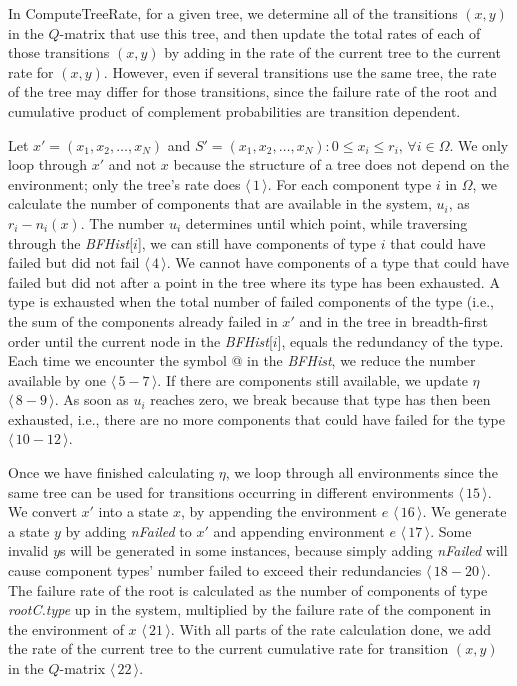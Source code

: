 \documentclass[12pt]{article}
\newcommand{\varName}[1]{\textrm{\it#1}}
\newcommand{\citeLine}[1]{$\langle \, #1 \, \rangle$}
\newcommand{\citeBlock}[2]{$\langle \, #1 - #2 \, \rangle$}
\begin{document}
In ComputeTreeRate, for a given tree, we determine all of the transitions $(x, y)$ in the $Q$-matrix that use this tree, and then update the total rates of each of those transitions $(x, y)$ by adding in the rate of the current tree to the current rate for $(x, y)$. However, even if several transitions use the same tree, the rate of the tree may differ for those transitions, since the failure rate of the root and cumulative product of complement probabilities are transition dependent.

Let $x' = (x_{1}, x_{2}, \ldots, x_{N})$ and $S' = (x_{1}, x_{2}, \ldots, x_{N}): 0 \leq x_{i} \leq r_{i}, \, \forall i \in \Omega$. We only loop through $x'$ and not $x$ because the structure of a tree does not depend on the environment; only the tree's rate does \citeLine{1}. For each component type $i$ in $\Omega$, we calculate the number of components that are available in the system, $u_{i}$, as $r_{i} - n_{i}(x)$. The number $u_{i}$ determines until which point, while traversing through the \varName{BFHist}[$i$], we can still have components of type $i$ that could have failed but did not fail \citeLine{4}. We cannot have components of a type that could have failed but did not after a point in the tree where its type has been exhausted. A type is exhausted when the total number of failed components of the type (i.e., the sum of the components already failed in $x'$ and in the tree in breadth-first order until the current node in the \varName{BFHist}[$i$], equals the redundancy of the type. Each time we encounter the symbol @ in the \varName{BFHist}, we reduce the number available by one \citeBlock{5}{7}. If there are components still available, we update $\eta$ \citeBlock{8}{9}. As soon as $u_{i}$ reaches zero, we break because that type has then been exhausted, i.e., there are no more components that could have failed for the type \citeBlock{10}{12}.

Once we have finished calculating $\eta$, we loop through all environments since the same tree can be used for transitions occurring in different environments \citeLine{15}. We convert $x'$ into a state $x$, by appending the environment $e$ \citeLine{16}. We generate a state $y$ by adding \varName{nFailed} to $x'$ and appending environment $e$ \citeLine{17}. Some invalid $y$s will be generated in some instances, because simply adding \varName{nFailed} will cause component types' number failed to exceed their redundancies \citeBlock{18}{20}. The failure rate of the root is calculated as the number of components of type \varName{rootC.type} up in the system, multiplied by the failure rate of the component in the environment of $x$ \citeLine{21}. With all parts of the rate calculation done, we add the rate of the current tree to the current cumulative rate for transition $(x, y)$ in the $Q$-matrix \citeLine{22}.
\end{document}
